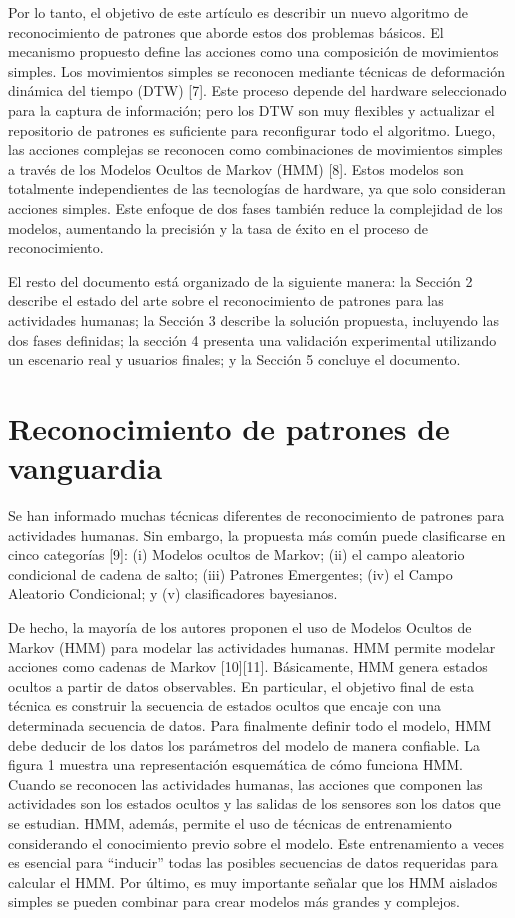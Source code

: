 \documentclass[10pt]{article}
\begin{document}
Por lo tanto, el objetivo de este artículo es describir un nuevo algoritmo de reconocimiento de patrones que aborde estos dos problemas básicos. El mecanismo propuesto define las acciones como una composición de movimientos simples. Los movimientos simples se reconocen mediante técnicas de deformación dinámica del tiempo (DTW) [7]. Este proceso depende del hardware seleccionado para la captura de información; pero los DTW son muy flexibles y actualizar el repositorio de patrones es suficiente para reconfigurar todo el algoritmo. Luego, las acciones complejas se reconocen como combinaciones de movimientos simples a través de los Modelos Ocultos de Markov (HMM) [8]. Estos modelos son totalmente independientes de las tecnologías de hardware, ya que solo consideran acciones simples. Este enfoque de dos fases también reduce la complejidad de los modelos, aumentando la precisión y la tasa de éxito en el proceso de reconocimiento. 
\newline

El resto del documento está organizado de la siguiente manera: la Sección 2 describe el estado del arte sobre el reconocimiento de patrones para las actividades humanas; la Sección 3 describe la solución propuesta, incluyendo las dos fases definidas; la sección 4 presenta una validación experimental utilizando un escenario real y usuarios finales; y la Sección 5 concluye el documento. 


\section{Reconocimiento de patrones de vanguardia }

Se han informado muchas técnicas diferentes de reconocimiento de patrones para actividades humanas. Sin embargo, la propuesta más común puede clasificarse en cinco categorías [9]: (i) Modelos ocultos de Markov; (ii) el campo aleatorio condicional de cadena de salto; (iii) Patrones Emergentes; (iv) el Campo Aleatorio Condicional; y (v) clasificadores bayesianos. 
\newline

De hecho, la mayoría de los autores proponen el uso de Modelos Ocultos de Markov (HMM) para modelar las actividades humanas. HMM permite modelar acciones como cadenas de Markov [10][11]. Básicamente, HMM genera estados ocultos a partir de datos observables. En particular, el objetivo final de esta técnica es construir la secuencia de estados ocultos que encaje con una determinada secuencia de datos. Para finalmente definir todo el modelo, HMM debe deducir de los datos los parámetros del modelo de manera confiable. La figura 1 muestra una representación esquemática de cómo funciona HMM. Cuando se reconocen las actividades humanas, las acciones que componen las actividades son los estados ocultos y las salidas de los sensores son los datos que se estudian. HMM, además, permite el uso de técnicas de entrenamiento considerando el conocimiento previo sobre el modelo. Este entrenamiento a veces es esencial para “inducir” todas las posibles secuencias de datos requeridas para calcular el HMM. Por último, es muy importante señalar que los HMM aislados simples se pueden combinar para crear modelos más grandes y complejos.
\end{document}
